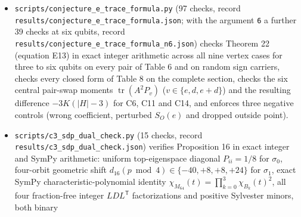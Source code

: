 \documentclass[11pt,a4paper]{article}
\begin{document}
\begin{itemize}
  record \nolinkurl{results/conjecture_e_lemmas_n6.json}) checks Lemmas 20 and 21 on the pairs of Table 6, in
  Gaussian-integer arithmetic on the same configurations. For both carriers of every pair it checks the
  identity \(\frac12(A_\sigma P_p+P_pA_\sigma)=\sum_q(\Lambda_\sigma)_{qp}P_q\) for every outside point \(p\), with
  \(\Lambda_\sigma\) filled from the outside lines; the hypotheses verified in the proof (the form and number
  of the outside Paulis, the real form fixed by \(M\mapsto J\bar MJ\) in C3, C5 and the bases of C11 and
  C14, the splitting by \(P_e\), and in C12 and C15 the action of \(\Theta_c\), the sign of \(\theta_c^2\), the
  eigenspaces of the two bases and the symmetry \(M^{\mathsf T}=\eta M\) of every outside block, which must
  be twice a unitary); the reduction of C8 to C1; and the
  conclusion of Lemma 21, by comparing \(\operatorname{tr}\Lambda_\sigma^j\), \(j\le6\), with the power sums of
  the eigenvalues that the lemma predicts from the blocks of \(A_\sigma\). Four negative controls,
  \(\kappa=1\) in C1, one flipped sign of \(\Lambda_\sigma\), \(\eta=-1\) in C12 and, in C12, a second basis
  equal to the first, must fail. The record is
  \nolinkurl{results/conjecture_e_lemmas.json}.
\item
  \nolinkurl{scripts/conjecture_e_trace_formula.py} (97 checks, record \nolinkurl{results/conjecture_e_trace_formula.json};
  with the argument \texttt{6} a further 39 checks at six qubits, record \nolinkurl{results/conjecture_e_trace_formula_n6.json})
  checks Theorem 22 (equation E13) in exact integer arithmetic across all nine vertex cases for three to
  six qubits on every pair of Table 6 and on random sign carriers, checks every closed form of Table 8 on
  the complete section, checks the six central pair-swap moments \(\operatorname{tr}(A^2P_v)\)
  (\(v\in\{e,d,e+d\}\)) and the resulting difference \(-3K(|H|-3)\) for C6, C11 and C14, and enforces three
  negative controls (wrong coefficient, perturbed \(S_O(e)\) and dropped outside point).
\item
  \nolinkurl{scripts/c3_sdp_dual_check.py} (15 checks, record \nolinkurl{results/c3_sdp_dual_check.json}) verifies
  Proposition 16\textquotesingle{} in exact integer and SymPy arithmetic: uniform top-eigenspace diagonal \(P_{ii}=1/8\) for
  \(\sigma_0\), four-orbit geometric shift \(d_{16}(p\bmod4)\in\{-40,+8,+8,+24\}\) for \(\sigma_1\), exact
  SymPy characteristic-polynomial identity \(\chi_{M_{64}}(t)=\prod_{k=0}^3\chi_{B_k}(t)^2\), all four
  fraction-free integer \(LDL^{\mathsf T}\) factorizations and positive Sylvester minors, both binary

\end{itemize}
\end{document}
